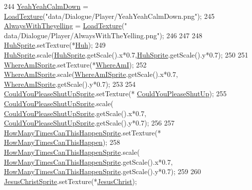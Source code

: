 \begin{DoxyCode}
244     \hyperlink{classDialogue_a76c288944980116289e0f82fe8e03cd6}{YeahYeahCalmDown} = \hyperlink{classDialogue_a3fb8644f167af142d1413c0fa6b74434}{LoadTexture}(\textcolor{stringliteral}{"data/Dialogue/Player/YeahYeahCalmDown.png"});
245     \hyperlink{classDialogue_a7744310841a2275354c458d8ec32463d}{AlwaysWithTheyelling} = \hyperlink{classDialogue_a3fb8644f167af142d1413c0fa6b74434}{LoadTexture}(\textcolor{stringliteral}{"
      data/Dialogue/Player/AlwaysWithTheYelling.png"});
246 
247 
248     \hyperlink{classDialogue_ae6af9a5ea9b38c71cf31cfef5c213e39}{HuhSprite}.setTexture(*\hyperlink{classDialogue_a20a28f958cc46b2cf20de4d448a68cba}{Huh});
249     \hyperlink{classDialogue_ae6af9a5ea9b38c71cf31cfef5c213e39}{HuhSprite}.scale(\hyperlink{classDialogue_ae6af9a5ea9b38c71cf31cfef5c213e39}{HuhSprite}.getScale().x*0.7,\hyperlink{classDialogue_ae6af9a5ea9b38c71cf31cfef5c213e39}{HuhSprite}.getScale().y*0.7);
250 
251     \hyperlink{classDialogue_a1f385137c38c6adee1eef6f32f4abefd}{WhereAmISprite}.setTexture(*\hyperlink{classDialogue_aea8f799a49bbd52aa97d06be06d2df78}{WhereAmI});
252     \hyperlink{classDialogue_a1f385137c38c6adee1eef6f32f4abefd}{WhereAmISprite}.scale(\hyperlink{classDialogue_a1f385137c38c6adee1eef6f32f4abefd}{WhereAmISprite}.getScale().x*0.7,
      \hyperlink{classDialogue_a1f385137c38c6adee1eef6f32f4abefd}{WhereAmISprite}.getScale().y*0.7);
253 
254     \hyperlink{classDialogue_afb2613f4ba14a82702345cbdcd6dcb95}{CouldYouPleaseShutUpSprite}.setTexture(*
      \hyperlink{classDialogue_a096e13e79fd7fe87bcca35587b983096}{CouldYouPleaseShutUp});
255     \hyperlink{classDialogue_afb2613f4ba14a82702345cbdcd6dcb95}{CouldYouPleaseShutUpSprite}.scale( 
      \hyperlink{classDialogue_afb2613f4ba14a82702345cbdcd6dcb95}{CouldYouPleaseShutUpSprite}.getScale().x*0.7, 
      \hyperlink{classDialogue_afb2613f4ba14a82702345cbdcd6dcb95}{CouldYouPleaseShutUpSprite}.getScale().y*0.7);
256 
257     \hyperlink{classDialogue_a1a895aadcac2ff23681623c889b7f131}{HowManyTimesCanThisHappenSprite}.setTexture(*
      \hyperlink{classDialogue_a5b48f0c92e6d73203ae69b48cb346341}{HowManyTimesCanThisHappen});
258     \hyperlink{classDialogue_a1a895aadcac2ff23681623c889b7f131}{HowManyTimesCanThisHappenSprite}.scale(
      \hyperlink{classDialogue_a1a895aadcac2ff23681623c889b7f131}{HowManyTimesCanThisHappenSprite}.getScale().x*0.7,
      \hyperlink{classDialogue_a1a895aadcac2ff23681623c889b7f131}{HowManyTimesCanThisHappenSprite}.getScale().y*0.7);
259 
260     \hyperlink{classDialogue_a878b13ffe10617ab228e8630c53dcdca}{JesusChristSprite}.setTexture(*\hyperlink{classDialogue_ac65dd7b620f7aedb611f54dbd5cc5a23}{JesusChrist});

\end{DoxyCode}
